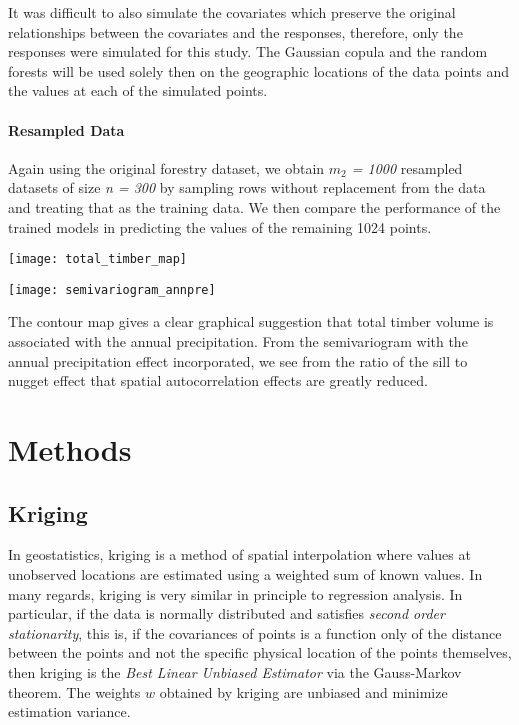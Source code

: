 \documentclass{article}
\begin{document}
It was difficult to also simulate the covariates which preserve the original relationships between the covariates and the responses, therefore, only the responses were simulated for this study.
The Gaussian copula and the random forests will be used solely then on the geographic locations of the data points and the values at each of the simulated points.

\paragraph{Resampled Data} Again using the original forestry dataset, we obtain \textit{$m_2$ = 1000} resampled datasets of size \textit{n = 300} by sampling rows without replacement from the data and treating that as the training data.
We then compare the performance of the trained models in predicting the values of the remaining 1024 points.
\vspace{.5cm}

\begin{minipage}[t]{.45\textwidth}
\texttt{[image: total\_timber\_map]}
\end{minipage}
\begin{minipage}[t]{.45\textwidth}
\texttt{[image: semivariogram\_annpre]}
\end{minipage}

The contour map gives a clear graphical suggestion that total timber volume is associated with the annual precipitation.
From the semivariogram with the annual precipitation effect incorporated, we see from the ratio of the sill to nugget effect that spatial autocorrelation effects are greatly reduced.

\section{Methods}

\subsection{Kriging}
In geostatistics, kriging is a method of spatial interpolation where values at unobserved locations are estimated using a weighted sum of known values.
In many regards, kriging is very similar in principle to regression analysis.
In particular, if the data is normally distributed and satisfies \textit{second order stationarity}, this is, if the covariances of points is a function only of the distance between the points and not the specific physical location of the points themselves, then kriging is the \textit{Best Linear Unbiased Estimator} via the Gauss-Markov theorem.
The weights $w$ obtained by kriging are unbiased and minimize estimation variance.
\end{document}
